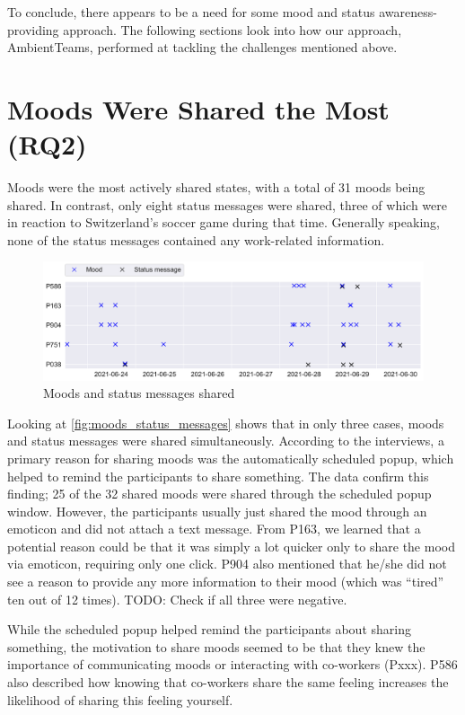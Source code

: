 To conclude, there appears to be a need for some mood and status awareness-providing approach. The following sections look into how our approach, AmbientTeams, performed at tackling the challenges mentioned above.

\section{Moods Were Shared the Most (RQ2)}
Moods were the most actively shared states, with a total of 31 moods being shared. In contrast, only eight status messages were shared, three of which were in reaction to Switzerland's soccer game during that time. Generally speaking, none of the status messages contained any work-related information.

\begin{figure}[h]
    \centering
    \includegraphics[width=\linewidth]{plots/moods_status_messages.pdf}
    \caption{Moods and status messages shared}
    \label{fig:moods_status_messages}
\end{figure}

Looking at \autoref{fig:moods_status_messages} shows that in only three cases, moods and status messages were shared simultaneously. According to the interviews, a primary reason for sharing moods was the automatically scheduled popup, which helped to remind the participants to share something. The data confirm this finding; 25 of the 32 shared moods were shared through the scheduled popup window. However, the participants usually just shared the mood through an emoticon and did not attach a text message. From P163, we learned that a potential reason could be that it was simply a lot quicker only to share the mood via emoticon, requiring only one click. P904 also mentioned that he/she did not see a reason to provide any more information to their mood (which was \enquote{tired} ten out of 12 times). TODO: Check if all three were negative.

While the scheduled popup helped remind the participants about sharing something, the motivation to share moods seemed to be that they knew the importance of communicating moods or interacting with co-workers (Pxxx). P586 also described how knowing that co-workers share the same feeling increases the likelihood of sharing this feeling yourself.

